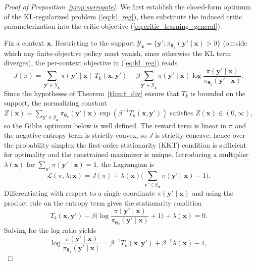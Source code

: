\begin{proof}[Proof of Proposition~\ref{prop:surrogate}]
We first establish the closed-form optimum of the KL-regularized problem (\ref{eq:kl_reg}), then substitute the induced critic parameterization into the critic objective (\ref{eq:critic_learning_general}).

Fix a context $\boldsymbol{x}$. Restricting to the support $\mathcal{Y}_{\boldsymbol{x}}=\{\boldsymbol{y}':\pi_{\boldsymbol{\theta}_{k}}(\boldsymbol{y}'\mid\boldsymbol{x})>0\}$ (outside which any finite-objective policy must vanish, since otherwise the KL term diverges), the per-context objective in (\ref{eq:kl_reg}) reads
\[
J(\pi)=\sum_{\boldsymbol{y}'\in\mathcal{Y}_{\boldsymbol{x}}}\pi(\boldsymbol{y}'\mid\boldsymbol{x})\,T_{k}(\boldsymbol{x},\boldsymbol{y}')
-\beta\sum_{\boldsymbol{y}'\in\mathcal{Y}_{\boldsymbol{x}}}\pi(\boldsymbol{y}'\mid\boldsymbol{x})\log\frac{\pi(\boldsymbol{y}'\mid\boldsymbol{x})}{\pi_{\boldsymbol{\theta}_{k}}(\boldsymbol{y}'\mid\boldsymbol{x})}.
\]
Since the hypotheses of Theorem~\ref{thm:f_div} ensure that $T_{k}$ is bounded on the support, the normalizing constant
$Z(\boldsymbol{x})=\sum_{\boldsymbol{y}'\in\mathcal{Y}_{\boldsymbol{x}}}\pi_{\boldsymbol{\theta}_{k}}(\boldsymbol{y}'\mid\boldsymbol{x})\exp(\beta^{-1}T_{k}(\boldsymbol{x},\boldsymbol{y}'))$ satisfies $Z(\boldsymbol{x})\in(0,\infty)$, so the Gibbs optimum below is well defined.
The reward term is linear in $\pi$ and the negative-entropy term is strictly convex, so $J$ is strictly concave; hence over the probability simplex the first-order stationarity (KKT) condition is sufficient for optimality and the constrained maximizer is unique. Introducing a multiplier $\lambda(\boldsymbol{x})$ for $\sum_{\boldsymbol{y}'}\pi(\boldsymbol{y}'\mid\boldsymbol{x})=1$, the Lagrangian is
\[
\mathcal{L}(\pi,\lambda;\boldsymbol{x})=J(\pi)+\lambda(\boldsymbol{x})\Big(\sum_{\boldsymbol{y}'\in\mathcal{Y}_{\boldsymbol{x}}}\pi(\boldsymbol{y}'\mid\boldsymbol{x})-1\Big).
\]
Differentiating with respect to a single coordinate $\pi(\boldsymbol{y}'\mid\boldsymbol{x})$ and using the product rule on the entropy term gives the stationarity condition
\[
T_{k}(\boldsymbol{x},\boldsymbol{y}')-\beta\Big(\log\frac{\pi(\boldsymbol{y}'\mid\boldsymbol{x})}{\pi_{\boldsymbol{\theta}_{k}}(\boldsymbol{y}'\mid\boldsymbol{x})}+1\Big)+\lambda(\boldsymbol{x})=0.
\]
Solving for the log-ratio yields
\[
\log\frac{\pi(\boldsymbol{y}'\mid\boldsymbol{x})}{\pi_{\boldsymbol{\theta}_{k}}(\boldsymbol{y}'\mid\boldsymbol{x})}
=\beta^{-1}T_{k}(\boldsymbol{x},\boldsymbol{y}')+\beta^{-1}\lambda(\boldsymbol{x})-1,
\]
\end{proof}

